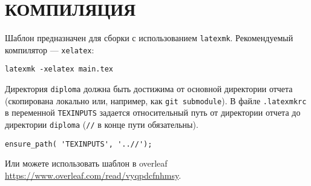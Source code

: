 \section{КОМПИЛЯЦИЯ}

Шаблон предназначен для сборки с использованием \texttt{latexmk}. Рекомендуемый компилятор --- \texttt{xelatex}:

\begin{verbatim}
latexmk -xelatex main.tex
\end{verbatim}

Директория \texttt{diploma} должна быть достижима от основной директории отчета (скопирована локально или, например, как \texttt{git submodule}). В файле \texttt{.latexmkrc} в переменной \texttt{TEXINPUTS} задается относительный путь от директории отчета до директории \texttt{diploma} (\texttt{//} в конце пути обязательны).

\begin{verbatim}
ensure_path( 'TEXINPUTS', '..//');
\end{verbatim}

Или можете использовать шаблон в overleaf \url{https://www.overleaf.com/read/vyqpdcfnhmsy}.

\lipsum[1-2]